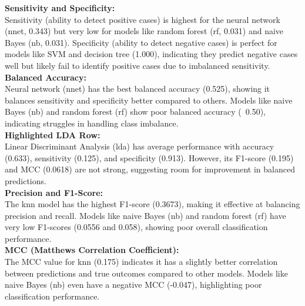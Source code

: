 \documentclass[12pt,a4paper]{article}
\begin{document}
  \textbf{Sensitivity and Specificity:}\\
  Sensitivity (ability to detect positive cases) is highest for the neural network (nnet, 0.343) but very low for models like random forest (rf, 0.031) and naive Bayes (nb, 0.031).
  Specificity (ability to detect negative cases) is perfect for models like SVM and decision tree (1.000), indicating they predict negative cases well but likely fail to identify positive cases due to imbalanced sensitivity.\\
  
  \textbf{Balanced Accuracy:}\\
  Neural network (nnet) has the best balanced accuracy (0.525), showing it balances sensitivity and specificity better compared to others.
  Models like naive Bayes (nb) and random forest (rf) show poor balanced accuracy (~0.50), indicating struggles in handling class imbalance.\\
  
  \textbf{Highlighted LDA Row:}\\
  Linear Discriminant Analysis (lda) has average performance with accuracy (0.633), sensitivity (0.125), and specificity (0.913). However, its F1-score (0.195) and MCC (0.0618) are not strong, suggesting room for improvement in balanced predictions.\\
  
  \textbf{Precision and F1-Score:} \\
  The knn model has the highest F1-score (0.3673), making it effective at balancing precision and recall.
  Models like naive Bayes (nb) and random forest (rf) have very low F1-scores (0.0556 and 0.058), showing poor overall classification performance. \\
  
  \textbf{MCC (Matthews Correlation Coefficient):} \\
  The MCC value for knn (0.175) indicates it has a slightly better correlation between predictions and true outcomes compared to other models. Models like naive Bayes (nb) even have a negative MCC (-0.047), highlighting poor classification performance. \\
  
\end{document}
